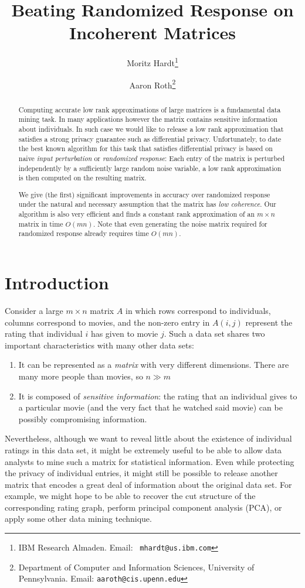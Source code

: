 \documentclass[letterpaper,11pt]{article}
\title{Beating Randomized Response on Incoherent Matrices}
\author{Moritz Hardt\thanks{IBM Research Almaden. Email: {\tt
mhardt@us.ibm.com}}
\and Aaron Roth\thanks{Department of Computer and Information Sciences, University of Pennsylvania. Email: {\tt aaroth@cis.upenn.edu}}}
\theoremstyle{definition}
\begin{document}
\maketitle

\begin{abstract}
Computing accurate low rank approximations of large matrices is a fundamental
data mining task. In many applications however the matrix contains sensitive
information about individuals. In such case we would like to release a low
rank approximation that satisfies a strong privacy guarantee such as
differential privacy. Unfortunately, to date the best known algorithm for this
task that satisfies differential privacy is based on naive \emph{input
perturbation} or \emph{randomized response}: Each entry of the matrix is
perturbed independently by a sufficiently large random noise variable, a low
rank approximation is then computed on the resulting matrix.

We give (the first) significant improvements in accuracy over randomized
response under the natural and necessary assumption that the matrix has
\emph{low coherence}.  Our algorithm is also very efficient and finds a
constant rank approximation of an $m\times n$ matrix in time $O(mn).$ Note
that even generating the noise matrix required for randomized response already
requires time $O(mn).$
\end{abstract}

\vfill
\thispagestyle{empty}
\pagebreak

\section{Introduction}
Consider a large $m\times n$ matrix $A$ in which rows correspond to
individuals, columns correspond to movies, and the non-zero entry in $A(i,j)$
represent the rating that individual $i$ has given to movie $j$.  Such a data
set shares two important characteristics with many other data sets:
\begin{enumerate}
\item It can be represented as a \emph{matrix} with very different dimensions. There are many more people than movies, so $n \gg m$
\item It is composed of \emph{sensitive information}: the rating that an individual gives to a particular movie (and the very fact that he watched said movie) can be possibly compromising information.
\end{enumerate}
Nevertheless, although we want to reveal little about the existence of
individual ratings in this data set, it might be extremely useful to
be able to allow data analysts to mine such a matrix for statistical
information. Even while protecting the privacy of individual entries, it might
still be possible to release another matrix that encodes a great deal of
information about the original data set. For example, we might hope to be able
to recover the cut structure of the corresponding rating graph, perform
principal component analysis (PCA), or apply some other data mining technique.
\end{document}
